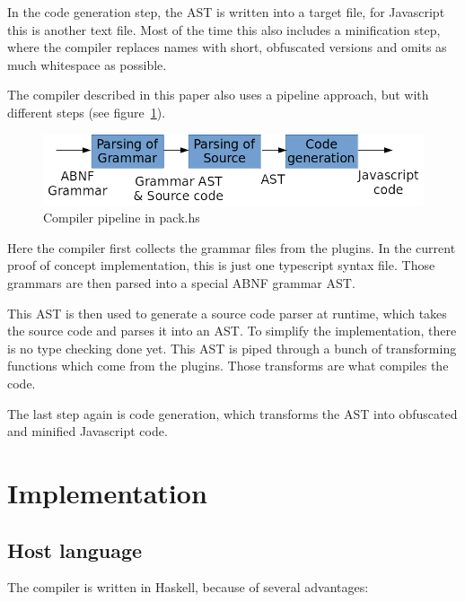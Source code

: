 In the code generation step, the AST is written into a target file, for Javascript this is another text file. Most of the time this also includes a minification step, where the compiler replaces names with short, obfuscated versions and omits as much whitespace as possible.

The compiler described in this paper also uses a pipeline approach, but with different steps (see figure~\ref{fig:pack.hs_pipeline}).

\begin{figure}[H]
\includegraphics[width=\columnwidth]{./pack_hs_pipeline.png}
\caption{Compiler pipeline in pack.hs}%
\label{fig:pack.hs_pipeline}
\end{figure}

Here the compiler first collects the grammar files from the plugins. In the current proof of concept implementation, this is just one typescript syntax file. Those grammars are then parsed into a special ABNF grammar AST\@.

This AST is then used to generate a source code parser at runtime, which takes the source code and parses it into an AST\@. To simplify the implementation, there is no type checking done yet. This AST is piped through a bunch of transforming functions which come from the plugins. Those transforms are what compiles the code.

The last step again is code generation, which transforms the AST into obfuscated and minified Javascript code.

\section{Implementation}

\subsection{Host language}

The compiler is written in Haskell, because of several advantages:

